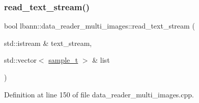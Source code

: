 \subsubsection{\texorpdfstring{read\+\_\+text\+\_\+stream()}{read\_text\_stream()}}
{\footnotesize\ttfamily bool lbann\+::data\+\_\+reader\+\_\+multi\+\_\+images\+::read\+\_\+text\+\_\+stream (\begin{DoxyParamCaption}\item[{std\+::istream \&}]{text\+\_\+stream,  }\item[{std\+::vector$<$ \hyperlink{classlbann_1_1data__reader__multi__images_a6cbb30001dd633b0d810c417cbbf441e}{sample\+\_\+t} $>$ \&}]{list }\end{DoxyParamCaption})\hspace{0.3cm}{\ttfamily [protected]}}



Definition at line 150 of file data\+\_\+reader\+\_\+multi\+\_\+images.\+cpp.


